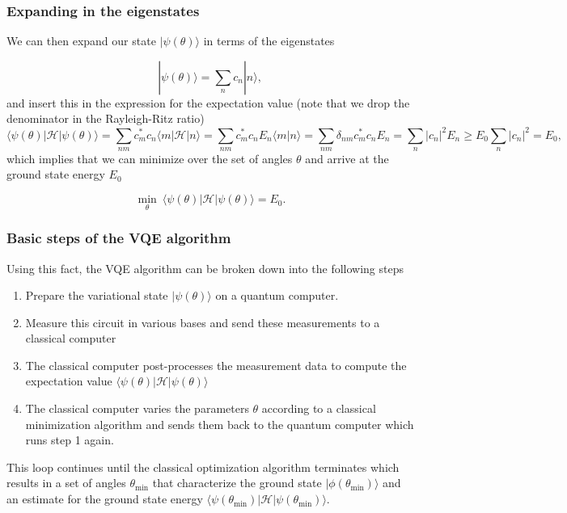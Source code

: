 \documentclass{beamer}
\begin{document}
\begin{frame}
\frametitle{Expanding in the eigenstates}

We can then expand our state $|\psi(\theta)\rangle$ in terms of the eigenstates

\[
|\psi(\theta)\rangle=\sum_nc_n|n\rangle,
\]
and insert this in the expression  for the expectation value (note that we drop the denominator in the Rayleigh-Ritz ratio) 
\[
\langle\psi(\theta)\vert \mathcal{H}\vert\psi(\theta)\rangle=\sum_{nm}c^*_mc_n\langle m\vert\mathcal{H}\vert n \rangle
=\sum_{nm}c^*_mc_nE_n\langle m\vert n \rangle=\sum_{nm}\delta_{nm}c^*_mc_nE_n=\sum_{n}\vert c_n\vert^2E_n \geq E_0\sum_{n}\vert c_n\vert^2=E_0,
\]
which implies that we can minimize over the set of angles $\theta$ and arrive at the ground state energy $E_0$

\[
\min_\theta \ \langle\psi(\theta)\vert \mathcal{H}\vert \psi(\theta)\rangle=E_0.
\]
\end{frame}

\begin{frame}
\frametitle{Basic steps of the VQE algorithm}

Using this fact, the VQE algorithm can be broken down into the following steps
\begin{enumerate}
\item Prepare the variational state $|\psi(\theta)\rangle$ on a quantum computer.

\item Measure this circuit in various bases and send these measurements to a classical computer

\item The classical computer post-processes the measurement data to compute the expectation value $\langle\psi(\theta)\vert \mathcal{H}\vert \psi(\theta)\rangle$

\item The classical computer varies the parameters $\theta$ according to a classical minimization algorithm and sends them back to the quantum computer which runs step 1 again.
\end{enumerate}

\noindent
This loop continues until the classical optimization algorithm
terminates which results in a set of angles $\theta_{\text{min}}$ that
characterize the ground state $|\phi(\theta_{\text{min}})\rangle$ and
an estimate for the ground state energy
$\langle\psi(\theta_{\text{min}})\vert\mathcal{H}\vert\psi(\theta_{\text{min}})\rangle$.
\end{frame}
\end{document}
